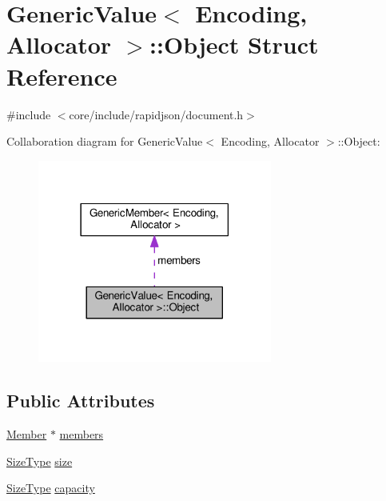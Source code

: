 \hypertarget{structGenericValue_1_1Object}{}\section{Generic\+Value$<$ Encoding, Allocator $>$\+:\+:Object Struct Reference}
\label{structGenericValue_1_1Object}


{\ttfamily \#include $<$core/include/rapidjson/document.\+h$>$}



Collaboration diagram for Generic\+Value$<$ Encoding, Allocator $>$\+:\+:Object\+:
\nopagebreak
\begin{figure}[H]
\begin{center}
\leavevmode
\includegraphics[width=218pt]{structGenericValue_1_1Object__coll__graph}
\end{center}
\end{figure}
\subsection*{Public Attributes}
\begin{DoxyCompactItemize}
\item 
\hyperlink{classGenericValue_a7ccf27c44058b4c11c3efc6473afb886}{Member} $\ast$ \hyperlink{structGenericValue_1_1Object_ab51b8366577cb12f0280e4a6d7dab926}{members}
\item 
\hyperlink{rapidjson_8h_a5ed6e6e67250fadbd041127e6386dcb5}{Size\+Type} \hyperlink{structGenericValue_1_1Object_a10da3d9035961100ed11f955a4afd2b6}{size}
\item 
\hyperlink{rapidjson_8h_a5ed6e6e67250fadbd041127e6386dcb5}{Size\+Type} \hyperlink{structGenericValue_1_1Object_ab22a81c7ac57baf0d4ea343dfd6d8b33}{capacity}
\end{DoxyCompactItemize}


